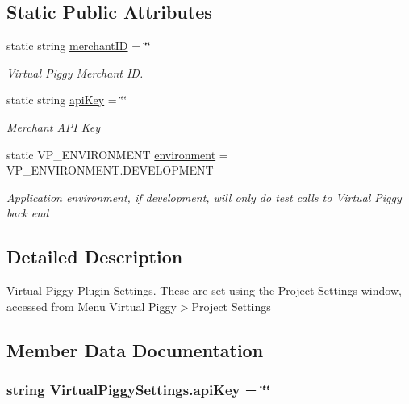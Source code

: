 \subsection*{Static Public Attributes}
\begin{DoxyCompactItemize}
\item 
static string \hyperlink{class_virtual_piggy_settings_af24b0af7a500e1e344784a0d209b3fbd}{merchant\-I\-D} = \char`\"{}\char`\"{}
\begin{DoxyCompactList}\small\item\em Virtual Piggy Merchant I\-D. \end{DoxyCompactList}\item 
static string \hyperlink{class_virtual_piggy_settings_a20fd188e30df7a325b9b089af0de683d}{api\-Key} = \char`\"{}\char`\"{}
\begin{DoxyCompactList}\small\item\em Merchant A\-P\-I Key \end{DoxyCompactList}\item 
static V\-P\-\_\-\-E\-N\-V\-I\-R\-O\-N\-M\-E\-N\-T \hyperlink{class_virtual_piggy_settings_aa1795be8074c0d0ef5abfd13bfbf3007}{environment} = V\-P\-\_\-\-E\-N\-V\-I\-R\-O\-N\-M\-E\-N\-T.\-D\-E\-V\-E\-L\-O\-P\-M\-E\-N\-T
\begin{DoxyCompactList}\small\item\em Application environment, if development, will only do test calls to Virtual Piggy back end \end{DoxyCompactList}\end{DoxyCompactItemize}


\subsection{Detailed Description}
Virtual Piggy Plugin Settings. These are set using the Project Settings window, accessed from Menu Virtual Piggy$>$Project Settings 



\subsection{Member Data Documentation}
\hypertarget{class_virtual_piggy_settings_a20fd188e30df7a325b9b089af0de683d}{
\subsubsection[{api\-Key}]{\setlength{\rightskip}{0pt plus 5cm}string Virtual\-Piggy\-Settings.\-api\-Key = \char`\"{}\char`\"{}\hspace{0.3cm}{\ttfamily [static]}}}\label{class_virtual_piggy_settings_a20fd188e30df7a325b9b089af0de683d}


